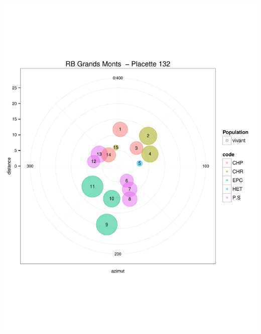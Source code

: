 \documentclass[a4paper]{book}\usepackage[]{graphicx}\usepackage[]{color}
\makeatletter
\def\maxwidth{ %
  \ifdim\Gin@nat@width>\linewidth
    \linewidth
  \else
    \Gin@nat@width
  \fi
}
\newenvironment{knitrout}{}{} %
\makeatother
\begin{document}
\begin{knitrout}
{\centering \includegraphics[width=\maxwidth]{Figures/PlanArbres-7} 

}





\end{knitrout}
\end{document}
